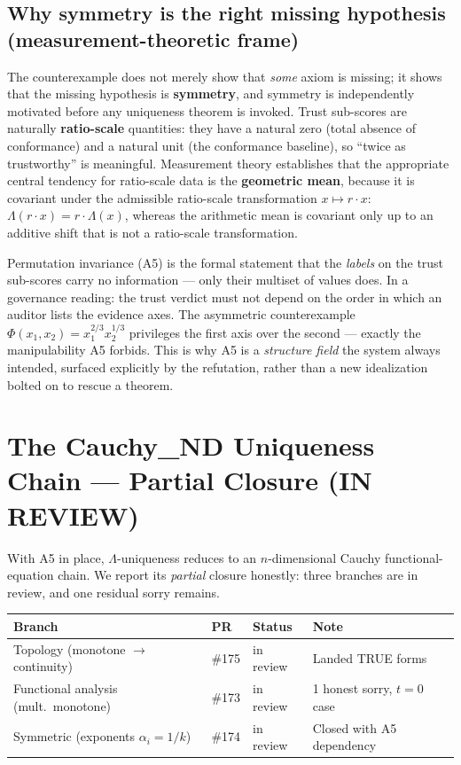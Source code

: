 \documentclass[11pt]{article}
\theoremstyle{plain}
\theoremstyle{definition}
\theoremstyle{remark}
\newcommand{\La}{\Lambda}
\begin{document}
\subsection{Why symmetry is the right missing hypothesis (measurement-theoretic frame)}
The counterexample does not merely show that \emph{some} axiom is missing; it shows
that the missing hypothesis is \textbf{symmetry}, and symmetry is independently
motivated before any uniqueness theorem is invoked. Trust sub-scores are naturally
\textbf{ratio-scale} quantities: they have a natural zero (total absence of
conformance) and a natural unit (the conformance baseline), so ``twice as
trustworthy'' is meaningful. Measurement theory establishes that the appropriate
central tendency for ratio-scale data is the \textbf{geometric mean}, because it is
covariant under the admissible ratio-scale transformation $x\mapsto r\cdot x$:
$\La(r\cdot x)=r\cdot\La(x)$, whereas the arithmetic mean is covariant only up to an
additive shift that is not a ratio-scale transformation.

Permutation invariance (A5) is the formal statement that the \emph{labels} on the
trust sub-scores carry no information --- only their multiset of values does. In a
governance reading: the trust verdict must not depend on the order in which an
auditor lists the evidence axes. The asymmetric counterexample
$\Phi(x_1,x_2)=x_1^{2/3}x_2^{1/3}$ privileges the first axis over the second ---
exactly the manipulability A5 forbids. This is why A5 is a \emph{structure field} the
system always intended, surfaced explicitly by the refutation, rather than a new
idealization bolted on to rescue a theorem.

\section{The Cauchy\_ND Uniqueness Chain --- Partial Closure (IN REVIEW)}

With A5 in place, $\La$-uniqueness reduces to an $n$-dimensional Cauchy
functional-equation chain. We report its \emph{partial} closure honestly: three
branches are in review, and one residual sorry remains.

\begin{center}
\begin{tabular}{@{}llll@{}}
\toprule
\textbf{Branch} & \textbf{PR} & \textbf{Status} & \textbf{Note} \\
\midrule
Topology (monotone $\to$ continuity) & \#175 & in review & Landed TRUE forms \\
Functional analysis (mult.\ monotone) & \#173 & in review & 1 honest sorry, $t=0$ case \\
Symmetric (exponents $\alpha_i = 1/k$) & \#174 & in review & Closed with A5 dependency \\
\bottomrule
\end{tabular}
\end{center}
\end{document}
